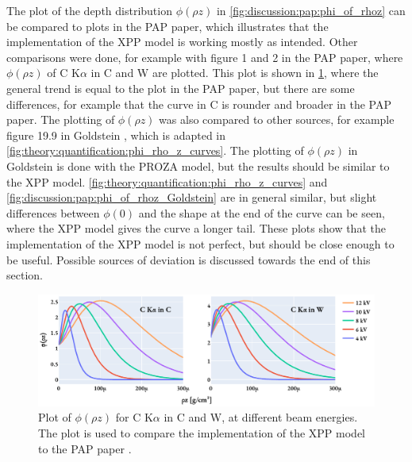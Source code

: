 The plot of the depth distribution $\phi(\rho z)$ in \cref{fig:discussion:pap:phi_of_rhoz} can be compared to plots in the PAP paper\cite{pap_1991}, which illustrates that the implementation of the XPP model is working mostly as intended.
Other comparisons were done, for example with figure 1 and 2 in the PAP paper, where $\phi(\rho z)$ of C K$\alpha$ in C and W are plotted.
This plot is shown in \cref{fig:discussion:pap:phi_of_rhoz_C_Ka}, where the general trend is equal to the plot in the PAP paper, but there are some differences, for example that the curve in C is rounder and broader in the PAP paper.
The plotting of $\phi(\rho z)$ was also compared to other sources, for example figure 19.9 in Goldstein \cite[Fig. 19.9]{goldstein_scanning_2018}, which is adapted in \cref{fig:theory:quantification:phi_rho_z_curves}.
The plotting of $\phi(\rho z)$ in Goldstein is done with the PROZA model, but the results should be similar to the XPP model.
\cref{fig:theory:quantification:phi_rho_z_curves} and \cref{fig:discussion:pap:phi_of_rhoz_Goldstein} are in general similar, but slight differences between $\phi(0)$ and the shape at the end of the curve can be seen, where the XPP model gives the curve a longer tail.
These plots show that the implementation of the XPP model is not perfect, but should be close enough to be useful.
Possible sources of deviation is discussed towards the end of this section.

\begin{figure}[htbp]
    \centering
    \includegraphics[width=0.9\linewidth]{figures/discussion/PAP_phi_of_rhoz_C_Ka.pdf}
    \caption{
        Plot of $\phi(\rho z)$ for C K$\alpha$ in C and W, at different beam energies.
        The plot is used to compare the implementation of the XPP model to the PAP paper \cite[Fig. 1 and 2]{pap_1991}.
    }
    \label{fig:discussion:pap:phi_of_rhoz_C_Ka}
\end{figure}




